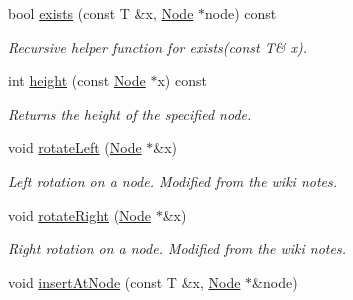 \begin{DoxyCompactItemize}
\item 
\hypertarget{class_tree_set_a586c4cdd9e0595ab9e7a82f414ddab2f}{bool \hyperlink{class_tree_set_a586c4cdd9e0595ab9e7a82f414ddab2f}{exists} (const T \&x, \hyperlink{class_tree_set_1_1_node}{Node} $\ast$node) const }\label{class_tree_set_a586c4cdd9e0595ab9e7a82f414ddab2f}

\begin{DoxyCompactList}\small\item\em Recursive helper function for exists(const T\& x). \end{DoxyCompactList}\item 
\hypertarget{class_tree_set_a7e92a253ef7ee418c928b765c348c76e}{int \hyperlink{class_tree_set_a7e92a253ef7ee418c928b765c348c76e}{height} (const \hyperlink{class_tree_set_1_1_node}{Node} $\ast$x) const }\label{class_tree_set_a7e92a253ef7ee418c928b765c348c76e}

\begin{DoxyCompactList}\small\item\em Returns the height of the specified node. \end{DoxyCompactList}\item 
\hypertarget{class_tree_set_aa5c54abdebd13a5445d60a9a729f93d2}{void \hyperlink{class_tree_set_aa5c54abdebd13a5445d60a9a729f93d2}{rotate\-Left} (\hyperlink{class_tree_set_1_1_node}{Node} $\ast$\&x)}\label{class_tree_set_aa5c54abdebd13a5445d60a9a729f93d2}

\begin{DoxyCompactList}\small\item\em Left rotation on a node. Modified from the wiki notes. \end{DoxyCompactList}\item 
\hypertarget{class_tree_set_a74952fa1657571f841b3ad5176939ffc}{void \hyperlink{class_tree_set_a74952fa1657571f841b3ad5176939ffc}{rotate\-Right} (\hyperlink{class_tree_set_1_1_node}{Node} $\ast$\&x)}\label{class_tree_set_a74952fa1657571f841b3ad5176939ffc}

\begin{DoxyCompactList}\small\item\em Right rotation on a node. Modified from the wiki notes. \end{DoxyCompactList}\item 
\hypertarget{class_tree_set_ab63b4fc9e84f2ec7b0ec8c6ddc246e35}{void \hyperlink{class_tree_set_ab63b4fc9e84f2ec7b0ec8c6ddc246e35}{insert\-At\-Node} (const T \&x, \hyperlink{class_tree_set_1_1_node}{Node} $\ast$\&node)}\label{class_tree_set_ab63b4fc9e84f2ec7b0ec8c6ddc246e35}


\end{DoxyCompactItemize}

